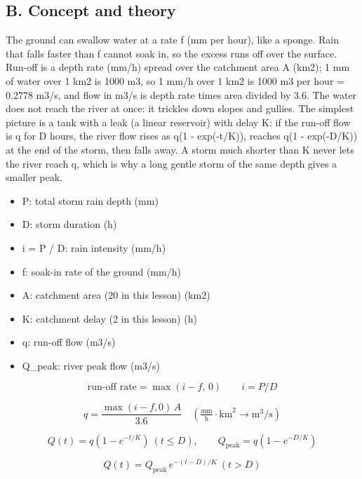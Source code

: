 \documentclass[11pt,a4paper]{article}
\begin{document}
\subsection*{B. Concept and theory}
The ground can swallow water at a rate f (mm per hour), like a sponge. Rain that falls faster than f cannot soak in, so the excess runs off over the surface. Run-off is a depth rate (mm/h) spread over the catchment area A (km2); 1 mm of water over 1 km2 is 1000 m3, so 1 mm/h over 1 km2 is 1000 m3 per hour = 0.2778 m3/s, and flow in m3/s is depth rate times area divided by 3.6. The water does not reach the river at once: it trickles down slopes and gullies. The simplest picture is a tank with a leak (a linear reservoir) with delay K: if the run-off flow is q for D hours, the river flow rises as q(1 - exp(-t/K)), reaches q(1 - exp(-D/K)) at the end of the storm, then falls away. A storm much shorter than K never lets the river reach q, which is why a long gentle storm of the same depth gives a smaller peak.

\begin{itemize}[nosep]
\item P: total storm rain depth (mm)
\item D: storm duration (h)
\item i = P / D: rain intensity (mm/h)
\item f: soak-in rate of the ground (mm/h)
\item A: catchment area (20 in this lesson) (km2)
\item K: catchment delay (2 in this lesson) (h)
\item q: run-off flow (m3/s)
\item Q\_peak: river peak flow (m3/s)
\end{itemize}

\begin{equation*}
\text{run-off rate}=\max(i-f,\,0)\qquad i=P/D
\end{equation*}

\begin{equation*}
q=\frac{\max(i-f,0)\,A}{3.6}\quad\left(\tfrac{\text{mm}}{\text{h}}\cdot\text{km}^2\to\text{m}^3/\text{s}\right)
\end{equation*}

\begin{equation*}
Q(t)=q\left(1-e^{-t/K}\right)\ (t\le D),\qquad Q_{\text{peak}}=q\left(1-e^{-D/K}\right)
\end{equation*}

\begin{equation*}
Q(t)=Q_{\text{peak}}\,e^{-(t-D)/K}\ (t>D)
\end{equation*}
\end{document}
